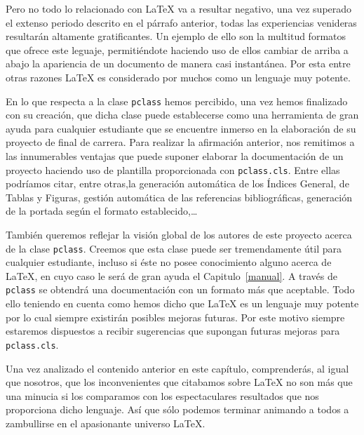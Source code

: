 	Pero no todo lo relacionado con \LaTeX{} va a resultar negativo, una vez superado el extenso periodo descrito en el
	p\'arrafo anterior, todas las experiencias venideras resultar\'an altamente gratificantes. Un ejemplo de ello son 
	la multitud formatos que ofrece este leguaje, permiti\'endote haciendo uso de ellos cambiar de arriba a abajo la
	apariencia de un documento de manera casi instant\'anea. Por esta entre otras razones \LaTeX{} es considerado por
	muchos como un lenguaje muy potente.
	
	En lo que respecta a la clase \texttt{pclass} hemos percibido, una vez hemos finalizado con su creaci\'on,
	que dicha clase puede establecerse como una herramienta de gran ayuda para cualquier estudiante que se
	encuentre inmerso en la elaboraci\'on de su proyecto de final de carrera. Para realizar la afirmaci\'on anterior,
	nos remitimos a las innumerables ventajas que puede suponer elaborar la documentaci\'on de un proyecto haciendo
	uso de plantilla proporcionada con \texttt{pclass.cls}. Entre ellas podr\'iamos citar, entre otras,la generaci\'on
	autom\'atica de los \'Indices General, de Tablas y Figuras, gesti\'on autom\'atica de las referencias 
	bibliogr\'aficas, generaci\'on de la portada seg\'un el formato establecido,\ldots
	
	Tambi\'en queremos reflejar la visi\'on global de los autores de este proyecto acerca de la clase 
	\texttt{pclass}. Creemos que esta clase puede ser tremendamente \'util para cualquier estudiante, incluso
	si \'este  no posee conocimiento alguno acerca de \LaTeX{}, en cuyo caso le ser\'a de gran ayuda el 
	Capitulo~\ref{manual}. A trav\'es de \texttt{pclass} se obtendr\'a una documentaci\'on con un formato
	m\'as que aceptable. Todo ello teniendo en cuenta como hemos dicho que \LaTeX{} es un lenguaje muy potente
	por lo cual siempre existir\'an posibles mejoras futuras. Por este motivo siempre estaremos dispuestos
	a recibir sugerencias que supongan futuras mejoras para \texttt{pclass.cls}.
	
	Una vez analizado el contenido anterior en este cap\'itulo, comprender\'as, al igual que nosotros, que los 
	inconvenientes que citabamos sobre \LaTeX{} no son m\'as que una minucia si los comparamos con los espectaculares 
	resultados que nos proporciona dicho lenguaje. As\'i que s\'olo podemos terminar animando a todos a zambullirse 
	en el apasionante universo \LaTeX{}. 